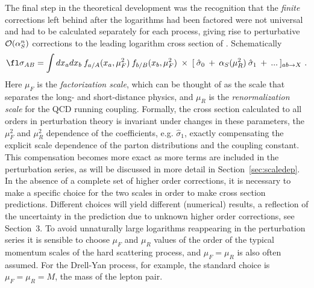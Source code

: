 \documentclass[12pt]{iopart}
\def\as{\alpha_S}
\def\sighat{\hat{\sigma}}
\begin{document}
The final step in the theoretical development was the recognition that the {\it finite}
corrections left behind after the logarithms had been factored were
not universal and had to be calculated separately for each process, giving rise
to perturbative ${\cal O}(\as^n)$ corrections to the leading logarithm
cross section of . Schematically
\begin{equation}
\fl
\sigma_{AB} = \int dx_a dx_b\>  f_{a/A}(x_a,\mu_F^2) \>
f_{b/B}(x_b,\mu_F^2)\;
\times \;  [\> \sighat_0\> +\> \as(\mu_R^2)\> \sighat_1\> +\> ...\> ]_{ab\to X} \ .
\label{signlo}
\end{equation}
Here $\mu_F$ is the {\it factorization scale}, which can be thought of as the scale that separates the long- and
short-distance physics, and $\mu_R$ is the {\it renormalization scale} for the QCD running coupling. Formally,
the cross section calculated to all orders in perturbation theory is invariant under changes in these
parameters, the $\mu_F^2$ and $\mu_R^2$ dependence of the coefficients,  e.g. $\sighat_1$, exactly compensating
the explicit scale dependence of the parton distributions and the coupling constant. This compensation becomes
more exact as more terms are included in the perturbation series, as will be discussed in more detail in
Section~\ref{sec:scaledep}. In the absence of a complete set of higher order corrections, it is necessary to make a
specific choice for the two scales in order to make cross section predictions. Different choices will yield
different (numerical) results, a reflection of the uncertainty in the prediction due to unknown higher order
corrections, see Section~3. To avoid unnaturally large logarithms reappearing in the perturbation series it is
sensible to choose $\mu_F$ and $\mu_R$ values of the order of the typical momentum scales of the hard scattering
process, and $\mu_F = \mu_R$ is also often assumed. For the Drell-Yan process, for example, the standard choice
is $\mu_F = \mu_R = M$, the mass of the lepton pair.
\end{document}
